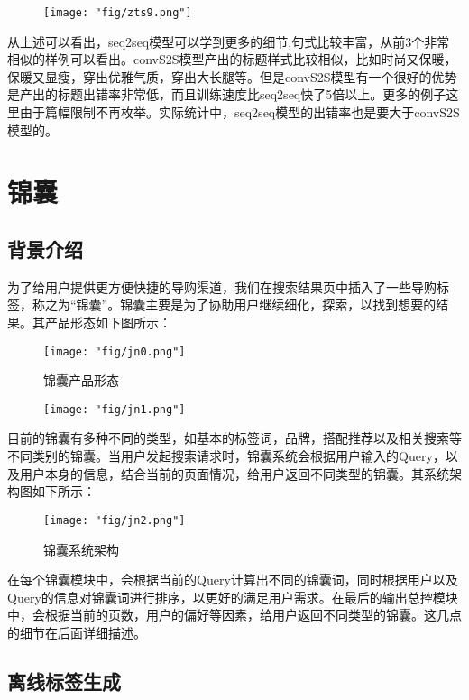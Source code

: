 \begin{figure}[!h]
	\centering
	\texttt{[image: "fig/zts9.png"]}
	\caption{}
	\label{fig:zts9}
\end{figure}

从上述可以看出，seq2seq模型可以学到更多的细节,句式比较丰富，从前3个非常相似的样例可以看出。convS2S模型产出的标题样式比较相似，比如时尚又保暖，保暖又显瘦，穿出优雅气质，穿出大长腿等。但是convS2S模型有一个很好的优势是产出的标题出错率非常低，而且训练速度比seq2seq快了5倍以上。更多的例子这里由于篇幅限制不再枚举。实际统计中，seq2seq模型的出错率也是要大于convS2S模型的。

\section{锦囊}
\subsection{背景介绍}
为了给用户提供更方便快捷的导购渠道，我们在搜索结果页中插入了一些导购标签，称之为“锦囊”。锦囊主要是为了协助用户继续细化，探索，以找到想要的结果。其产品形态如下图所示：

\begin{figure}[!h]
\begin{minipage}[t]{0.5\linewidth}
\centering
\texttt{[image: "fig/jn0.png"]}
\caption{锦囊产品形态}
\label{fig:jn0}
\end{minipage}%
\begin{minipage}[t]{0.5\linewidth}
\centering
\texttt{[image: "fig/jn1.png"]}
\caption{}
\label{fig:jn1}
\end{minipage}
\end{figure}

目前的锦囊有多种不同的类型，如基本的标签词，品牌，搭配推荐以及相关搜索等不同类别的锦囊。当用户发起搜索请求时，锦囊系统会根据用户输入的Query，以及用户本身的信息，结合当前的页面情况，给用户返回不同类型的锦囊。其系统架构图如下所示：

\begin{figure}[!h]
	\centering
	\texttt{[image: "fig/jn2.png"]}
	\caption{锦囊系统架构}
	\label{fig:jn2}
\end{figure}
在每个锦囊模块中，会根据当前的Query计算出不同的锦囊词，同时根据用户以及Query的信息对锦囊词进行排序，以更好的满足用户需求。在最后的输出总控模块中，会根据当前的页数，用户的偏好等因素，给用户返回不同类型的锦囊。这几点的细节在后面详细描述。

\subsection{离线标签生成}
